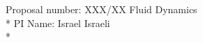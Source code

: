 \documentclass[a4paper,12pt]{report}
\newcommand{\bfl}{\bf \large}
\begin{document}
\noindent Proposal number: XXX/XX Fluid Dynamics\\*
PI Name: Israel Israeli \\*
\end{document}
